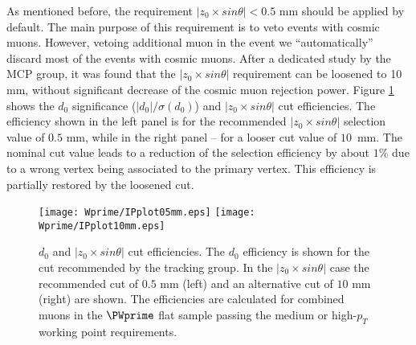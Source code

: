 As mentioned before, the requirement $|z_0 \times sin \theta| < 0.5$ mm should be applied by default. The main purpose of this requirement is to veto events with cosmic muons.
However, vetoing additional muon in the event we ``automatically'' discard most of the events with cosmic muons. After a dedicated study by the MCP group, it was found that the 
$|z_0 \times sin \theta|$ requirement can be loosened to 10 mm, without significant decrease of the cosmic muon rejection power.
Figure \ref{fig:Muon_LepVtxEff} shows the $d_0$ significance ($|d_0|/\sigma(d_0)$) and $|z_0 \times sin \theta|$ cut efficiencies. The efficiency shown in the left panel is for the recommended $|z_0 \times sin \theta|$ selection value of $0.5$ mm, while in the right panel -- for a looser
cut value of $10$~mm. The nominal cut value leads to a reduction of the selection efficiency by about $1$\% due to a wrong vertex being associated to the primary vertex. This efficiency is partially restored by the loosened cut.

\begin{figure}[]
  \centering
  \texttt{[image: Wprime/IPplot05mm.eps]}
  \texttt{[image: Wprime/IPplot10mm.eps]}
  \caption{$d_{0}$ and $|z_0 \times sin \theta|$ cut efficiencies. The $d_{0}$ efficiency is shown for the cut recommended by the tracking group. In the $|z_0 \times sin \theta|$ case the recommended cut of $0.5$ mm (left) and an alternative cut of $10$ mm (right) are shown. The efficiencies are calculated for combined muons in the
$\PWprime$ flat sample passing the medium or high-$p_T$ working point requirements.}
  \label{fig:Muon_LepVtxEff}
\end{figure}


